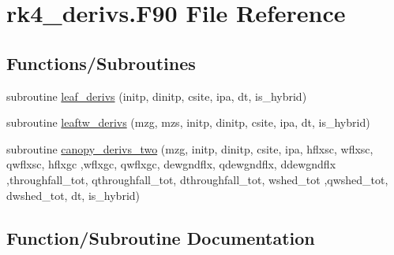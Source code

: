 \hypertarget{rk4__derivs_8_f90}{}\section{rk4\+\_\+derivs.\+F90 File Reference}
\label{rk4__derivs_8_f90}
\subsection*{Functions/\+Subroutines}
\begin{DoxyCompactItemize}
\item 
subroutine \hyperlink{rk4__derivs_8_f90_af52c3fe3be4810b2e477822bc0d32d0d}{leaf\+\_\+derivs} (initp, dinitp, csite, ipa, dt, is\+\_\+hybrid)
\item 
subroutine \hyperlink{rk4__derivs_8_f90_a3a5253c6dd08b63fa6ab684d0241226b}{leaftw\+\_\+derivs} (mzg, mzs, initp, dinitp, csite, ipa, dt, is\+\_\+hybrid)
\item 
subroutine \hyperlink{rk4__derivs_8_f90_a14ce7bded127d7e1f0c8fb55c99100e2}{canopy\+\_\+derivs\+\_\+two} (mzg, initp, dinitp, csite, ipa, hflxsc, wflxsc, qwflxsc, hflxgc                                                                                                                                   ,wflxgc, qwflxgc, dewgndflx, qdewgndflx, ddewgndflx                                                                                                                                                                       ,throughfall\+\_\+tot, qthroughfall\+\_\+tot, dthroughfall\+\_\+tot, wshed\+\_\+tot                                                                                                                   ,qwshed\+\_\+tot, dwshed\+\_\+tot, dt, is\+\_\+hybrid)
\end{DoxyCompactItemize}


\subsection{Function/\+Subroutine Documentation}
